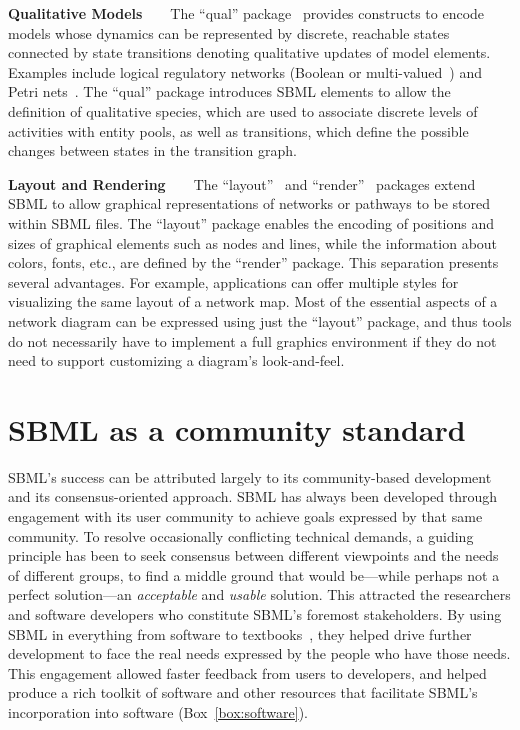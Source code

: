\documentclass{sbml-paper}
\begin{document}
\textbf{Qualitative Models}~~~~The ``qual'' package~\citep{Chaouiya2015sbml} provides constructs to encode models whose dynamics can be represented by discrete, reachable states connected by state transitions denoting qualitative updates of model elements. Examples include logical regulatory networks (Boolean or multi-valued~\citep{abou2016logical}) and Petri nets~\citep{chaouiya2007petri}. The ``qual'' package introduces SBML elements to allow the definition of qualitative species, which are used to associate discrete levels of activities with entity pools, as well as transitions, which define the possible changes between states in the transition graph.

\textbf{Layout and Rendering}~~~~The ``layout''~\citep{Gauges2015} and ``render''~\citep{Bergmann2018sbml} packages extend SBML to allow graphical representations of networks or pathways to be stored within SBML files. The ``layout'' package enables the encoding of positions and sizes of graphical elements such as nodes and lines, while the information about colors, fonts, etc., are defined by the ``render'' package. This separation presents several advantages. For example, applications can offer multiple styles for visualizing the same layout of a network map. Most of the essential aspects of a network diagram can be expressed using just the ``layout'' package, and thus tools do not necessarily have to implement a full graphics environment if they do not need to support customizing a diagram's look-and-feel.

\hrulefill

\newpage
\section*{SBML as a community standard}

SBML's success can be attributed largely to its community-based development and its consensus-oriented approach. SBML has always been developed through engagement with its user community to achieve goals expressed by that same community. To resolve occasionally conflicting technical demands, a guiding principle has been to seek consensus between different viewpoints and the needs of different groups, to find a middle ground that would be---while perhaps not a perfect solution---an \emph{acceptable} and \emph{usable} solution. This attracted the researchers and software developers who constitute SBML's foremost stakeholders. By using SBML in everything from software to textbooks~\citep[e.g.,][]{Cesario2011cancer, Sullivan2012introduction, Wilkinson2018stochastic, Klipp2016systems, Liu2009systems, Choi2008introduction, Sauro2014systems}, they helped drive further development to face the real needs expressed by the people who have those needs.  This engagement allowed faster feedback from users to developers, and helped produce a rich toolkit of software and other resources that facilitate SBML's incorporation into software (Box~\ref{box:software}).
\end{document}
